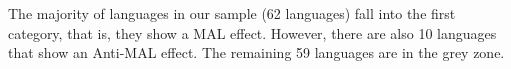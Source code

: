 The majority of languages in our sample (62 languages) fall into the first category, that is, they show a MAL effect. However, there are also 10 languages that show an Anti-MAL effect. The remaining 59 languages are in the grey zone.



